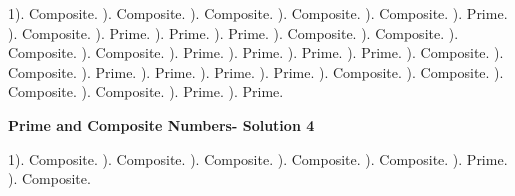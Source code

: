 \documentclass{article}%
\begin{document}
1). Composite.%
). Composite.%
). Composite.%
). Composite.%
). Composite.%
). Prime.%
). Composite.%
). Prime.%
). Prime.%
). Prime.%
). Composite.%
). Composite.%
). Composite.%
). Composite.%
). Prime.%
). Prime.%
). Prime.%
). Prime.%
). Composite.%
). Composite.%
). Prime.%
). Prime.%
). Prime.%
). Prime.%
). Composite.%
). Composite.%
). Composite.%
). Composite.%
). Prime.%
). Prime.%
\newline%
\newpage%
\large%
\begin{center}%
\textbf{Prime and Composite Numbers- Solution 4}%
\newline%
\end{center} \normalsize%
1). Composite.%
). Composite.%
). Composite.%
). Composite.%
). Composite.%
). Prime.%
). Composite.%
\newline%
\end{document}
